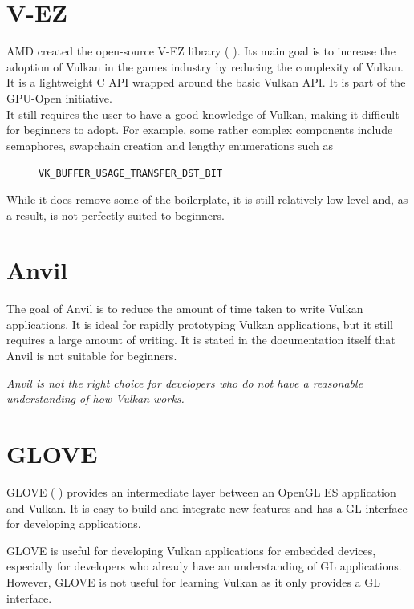 \documentclass[12pt]{report}
\newcommand{\citenoparen}[1]{\citeauthor{#1} \citeyear{#1}}
\newcommand{\citesoftware}[1]{(\citeauthor{#1} \citeyear{#1})}
\newcommand{\quotebu}[2]
{
  \begin{displayquote}[\citenoparen{#2}]
    \textit{#1}
  \end{displayquote}
}
\theoremstyle{definition}
\begin{document}
    \section{V-EZ}

      AMD created the open-source V-EZ library \citesoftware{vez}. Its main goal is to increase the
      adoption of Vulkan in the games industry by reducing the complexity of
      Vulkan. It is a lightweight C API wrapped around the basic Vulkan API.
      It is part of the GPU-Open initiative. \\
      
      It still requires the user to have a good knowledge of Vulkan, making it
      difficult for beginners to adopt. For example, some rather complex
      components include semaphores, swapchain creation and lengthy
      enumerations such as

        \begin{figure}[h!]
        \centering
        \verb|VK_BUFFER_USAGE_TRANSFER_DST_BIT|
        \end{figure}

      While it does remove some of the boilerplate, it is still relatively low
      level and, as a result, is not perfectly suited to beginners.

    \section{Anvil}

      The goal of Anvil is to reduce the amount of time taken to write Vulkan
      applications. It is ideal for rapidly prototyping Vulkan applications,
      but it still requires a large amount of writing. It is stated in the
      documentation itself that Anvil is not suitable for beginners.

      \quotebu{
        Anvil is not the right choice for developers who do not have a
        reasonable understanding of how Vulkan works.
      }{anvil}

    \section{GLOVE}

      GLOVE \citesoftware{glove} provides an intermediate layer
      between an OpenGL ES application and Vulkan. It is easy to build and
      integrate new features and has a GL interface for developing applications.

      GLOVE is useful for developing Vulkan applications for embedded devices,
      especially for developers who already have an understanding of GL
      applications. However, GLOVE is not useful for learning Vulkan
      as it only provides a GL interface.
\end{document}
